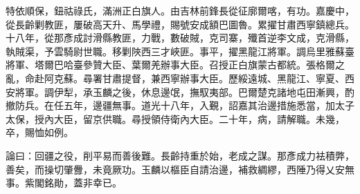 \begin{pinyinscope}
特依順保，鈕祜祿氏，滿洲正白旗人。由吉林前鋒長從征廓爾喀，有功。嘉慶中，從長齡剿教匪，屢破高天升、馬學禮，賜號安成額巴圖魯。累擢甘肅西寧鎮總兵。十八年，從那彥成討滑縣教匪，力戰，數破賊，克司寨，殲首逆李文成，克滑縣，執賊渠，予雲騎尉世職。移剿陜西三才峽匪。事平，擢黑龍江將軍。調烏里雅蘇臺將軍、塔爾巴哈臺參贊大臣、葉爾羌辦事大臣。召授正白旗蒙古都統。張格爾之亂，命赴阿克蘇。尋署甘肅提督，兼西寧辦事大臣。歷綏遠城、黑龍江、寧夏、西安將軍。調伊犁，承玉麟之後，休息邊氓，撫馭夷部。巴爾楚克諸地屯田漸興，酌撤防兵。在任五年，邊疆無事。道光十八年，入覲，詔嘉其治邊措施悉當，加太子太保，授內大臣，留京供職。尋授領侍衛內大臣。二十年，病，請解職。未幾，卒，賜恤如例。

論曰：回疆之役，削平易而善後難。長齡持重於始，老成之謀。那彥成力袪積弊，善矣，而操切肇釁，未竟厥功。玉麟以樞臣自請治邊，補救綢繆，西陲乃得乂安無事。紫閣銘勛，蓋非幸已。


\end{pinyinscope}